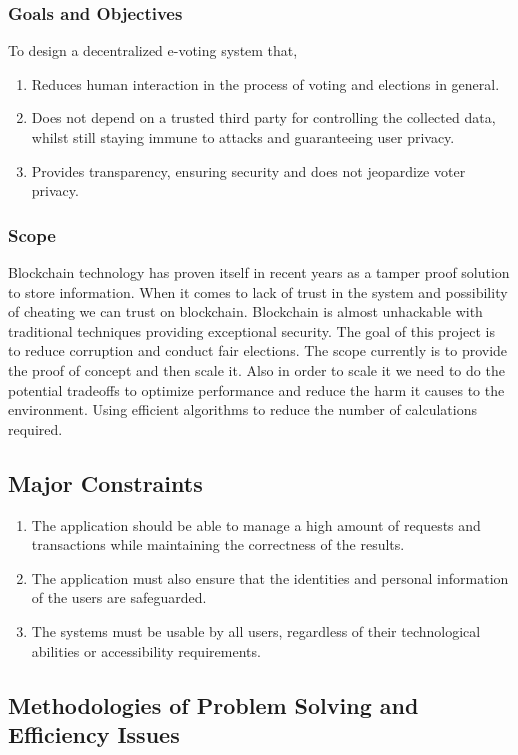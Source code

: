 \documentclass[oneside, 12pt]{book}
\begin{document}
			\subsubsection{Goals and Objectives}
				To design a decentralized e-voting system that,
				\begin{enumerate}
					\item Reduces human interaction in the process of voting and elections in general. 
					\item Does not depend on a trusted third party for controlling the collected data, whilst still staying immune to attacks and guaranteeing user privacy.
					\item Provides transparency, ensuring security and does not jeopardize voter privacy.
				\end{enumerate}
			\subsubsection{Scope}
				Blockchain technology has proven itself in recent years as a tamper proof solution to store information. When it comes to lack of trust in the system and possibility of cheating we can trust on blockchain. Blockchain is almost unhackable with traditional techniques providing exceptional security. The goal of this project is to reduce corruption and conduct fair elections. The scope currently is to provide the proof of concept and then scale it. Also in order to scale it we need to do the potential tradeoffs to optimize performance and reduce the harm it causes to the environment. Using efficient algorithms to reduce the number of calculations required.
		\subsection{Major Constraints}
			\begin{enumerate}
				\item The application should be able to manage a high amount of requests and transactions while maintaining the correctness of the results.
				\item The application must also ensure that the identities and personal information of the users are safeguarded.
				\item The systems must be usable by all users, regardless of their technological abilities or accessibility requirements.
			\end{enumerate}
		\subsection{Methodologies of Problem Solving and Efficiency Issues}
\end{document}
